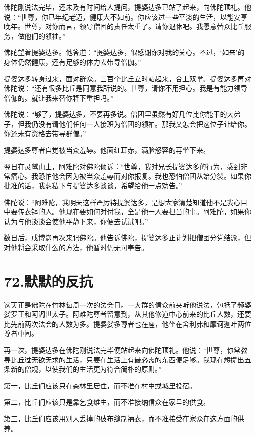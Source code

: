 \documentclass[12pt,twoside,openany]{book}
\begin{document}
佛陀刚说法完毕，还未及有时间给人提问，提婆达多已站了起来，向佛陀顶礼。他说：“世尊，你已年纪老迈，健康大不如前。你应该过一些平淡的生活，以能安享晚年。世尊，对你而言，领导僧团的责任太重了。请你退休吧。我愿意替众比丘服务，做他们的领袖。”

佛陀望着提婆达多。他答道：“提婆达多，很感谢你对我的关心。不过，‘如来’的身体仍然健康，还有足够的体力去带导僧伽。”

提婆达多转身过来，面对群众。三百个比丘立时站起来，合上双掌。提婆达多再对佛陀说：“还有很多比丘是同意我所说的。世尊，请你不用担心。我是有能力领导僧伽的。就让我来替你释下重担吗。”

佛陀说：“够了，提婆达多，不要再多说。僧团里虽然有好几位比你能干的大弟子，但我仍没有请他们任何一人接班为僧团的领袖。那我又怎会把这位子让给你。你还未有资格去带导群僧。”

提婆达多尊者自觉被当众羞辱。他面红耳赤，满脸怒容的再坐下来。

翌日在灵鹫山上，阿难陀对佛陀倾诉：“世尊，我对兄长提婆达多的行为，感到非常痛心。我恐怕他会因为被当众羞辱而对你报复。我也恐怕僧团从始分裂。如果你批准的话，我想私下与提婆达多谈谈，希望给他一点劝告。”

佛陀说：“阿难陀，我明天这样严厉待提婆达多，是想大家清楚知道他不是我心目中要传衣钵的人。他现在要如何对付我，全是他一人要担当的事。阿难陀，如果你认为与他谈谈会使他平静下来，你便去试试吧。”

数日后，戌博迦再次来记佛陀。他告诉佛陀，提婆达多正计划把僧团分党结派，但对他将会采取什么的方法，他暂时仍无可奉告。


\chapter{72.默默的反抗}\label{ch72}

这天正是佛陀在竹林每周一次的法会日。一大群的信众前来听他说法，包括了频婆娑罗王和阿阇世太子。阿难陀尊者留意到，从其他修道中心前来的比丘人数，还要比先前两次法会的人数为多。提婆娑多尊者也在座，他坐在舍利弗和摩诃迦叶两位尊者中间。

再一次，提婆达多在佛陀刚说法完毕便站起来向佛陀顶礼。他说：“世尊，你常教导比丘过无欲无求的生活，只要在生活上有最必需的东西便足够。我现在想提出五条新的僧规，以使我们的生活更为符合简朴的原则。”

第一，比丘们应该只在森林里居住，而不准在村中或城里投宿。

第二，比丘们应该只是靠乞食维生，而不准接纳信众在家里的供食。

第三，比丘们应该用别人丢掉的破布缝制衲衣，而不准接受在家众在这方面的供养。
\end{document}
